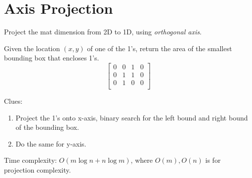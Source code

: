 \section{Axis Projection}
Project the mat dimension from 2D to 1D, using \textit{orthogonal axis}.

 Given the location $(x, y)$ of one of the 1's, return the area of the smallest bounding box that encloses 1's.
$$
\begin{bmatrix}
0& 0& 1& 0 \\
0& 1& 1& 0 \\ 
0& 1& 0& 0 \\
\end{bmatrix}
$$

Clues:
\begin{enumerate}
\item Project the 1's onto x-axis, binary search for the left bound and right bound of the bounding box. 
\item Do the same for y-axis. 
\end{enumerate}

Time complexity: $O(m\log n + n \log m)$, where $O(m), O(n)$ is for projection complexity. 
